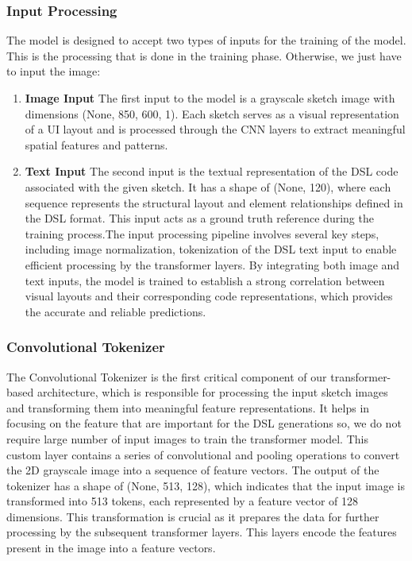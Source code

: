 \subsubsection{Input Processing}
The model is designed to accept two types of inputs for the training of the model. This is the processing that is done in the training phase. Otherwise, we just have to input the image:
\begin{enumerate}
    \item \textbf{Image Input}
    The first input to the model is a grayscale sketch image with dimensions (None, 850, 600, 1). Each sketch serves as a visual representation of a UI layout and is processed through the CNN layers to extract meaningful spatial features and patterns.
    \item \textbf{Text Input}
    The second input is the textual representation of the DSL code associated with the given sketch. It has a shape of (None, 120), where each sequence represents the structural layout and element relationships defined in the DSL format. This input acts as a ground truth reference during the training process.The input processing pipeline involves several key steps, including image normalization, tokenization of the DSL text input to enable efficient processing by the transformer layers. By integrating both image and text inputs, the model is trained to establish a strong correlation between visual layouts and their corresponding code representations, which provides the accurate and reliable predictions.
\end{enumerate}
\subsubsection{Convolutional Tokenizer}
The Convolutional Tokenizer is the first critical component of our transformer-based architecture, which is responsible for processing the input sketch images and transforming them into meaningful feature representations. It helps in focusing on the feature that are important for the DSL generations so, we do not require large number of input images to train the transformer model. This custom layer contains a series of convolutional and pooling operations to convert the 2D grayscale image into a sequence of feature vectors. The output of the tokenizer has a shape of (None, 513, 128), which indicates that the input image is transformed into 513 tokens, each represented by a feature vector of 128 dimensions. This transformation is crucial as it prepares the data for further processing by the subsequent transformer layers. This layers encode the features present in the image into a feature vectors.

